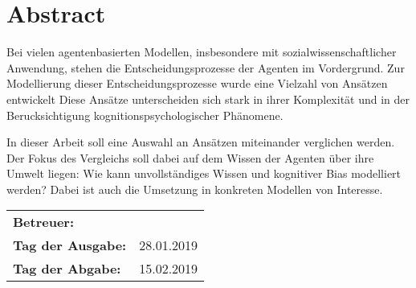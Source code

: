 \chapter*{Abstract}
Bei vielen agentenbasierten Modellen, insbesondere mit sozialwissenschaftlicher Anwendung, stehen die Entscheidungsprozesse der Agenten im Vordergrund. Zur
Modellierung dieser Entscheidungsprozesse wurde eine Vielzahl von Ansätzen entwickelt\cite{balke2014agents}
Diese Ansätze unterscheiden sich stark in ihrer Komplexität und in der Berucksichtigung
kognitionspsychologischer Phänomene.

In dieser Arbeit soll eine Auswahl an Ansätzen miteinander verglichen werden.
Der Fokus des Vergleichs soll dabei auf dem Wissen der Agenten über ihre Umwelt liegen: Wie kann unvollständiges Wissen und kognitiver Bias modelliert werden?
Dabei ist auch die Umsetzung in konkreten Modellen von Interesse.

\vfill

\begin{tabular}{ll}
	\bfseries Betreuer: & \parbox[t]{10cm}{\betreuer }\vspace{5mm} \\
	\bfseries Tag der Ausgabe: & 28.01.2019 \\
	\bfseries Tag der Abgabe: & 15.02.2019 \\
\end{tabular}
